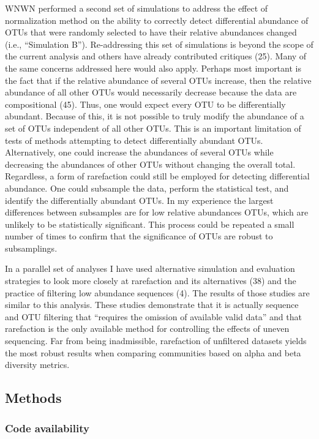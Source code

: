 \documentclass[
]{article}
\begin{document}
WNWN performed a second set of simulations to address the effect of
normalization method on the ability to correctly detect differential
abundance of OTUs that were randomly selected to have their relative
abundances changed (i.e., ``Simulation B''). Re-addressing this set of
simulations is beyond the scope of the current analysis and others have
already contributed critiques (25). Many of the same concerns addressed
here would also apply. Perhaps most important is the fact that if the
relative abundance of several OTUs increase, then the relative abundance
of all other OTUs would necessarily decrease because the data are
compositional (45). Thus, one would expect every OTU to be
differentially abundant. Because of this, it is not possible to truly
modify the abundance of a set of OTUs independent of all other OTUs.
This is an important limitation of tests of methods attempting to detect
differentially abundant OTUs. Alternatively, one could increase the
abundances of several OTUs while decreasing the abundances of other OTUs
without changing the overall total. Regardless, a form of rarefaction
could still be employed for detecting differential abundance. One could
subsample the data, perform the statistical test, and identify the
differentially abundant OTUs. In my experience the largest differences
between subsamples are for low relative abundances OTUs, which are
unlikely to be statistically significant. This process could be repeated
a small number of times to confirm that the significance of OTUs are
robust to subsamplings.

In a parallel set of analyses I have used alternative simulation and
evaluation strategies to look more closely at rarefaction and its
alternatives (38) and the practice of filtering low abundance sequences
(4). The results of those studies are similar to this analysis. These
studies demonstrate that it is actually sequence and OTU filtering that
``requires the omission of available valid data'' and that rarefaction
is the only available method for controlling the effects of uneven
sequencing. Far from being inadmissible, rarefaction of unfiltered
datasets yields the most robust results when comparing communities based
on alpha and beta diversity metrics.

\hypertarget{methods}{%
\subsection{Methods}\label{methods}}

\hypertarget{code-availability}{%
\subsubsection{Code availability}\label{code-availability}}
\end{document}
